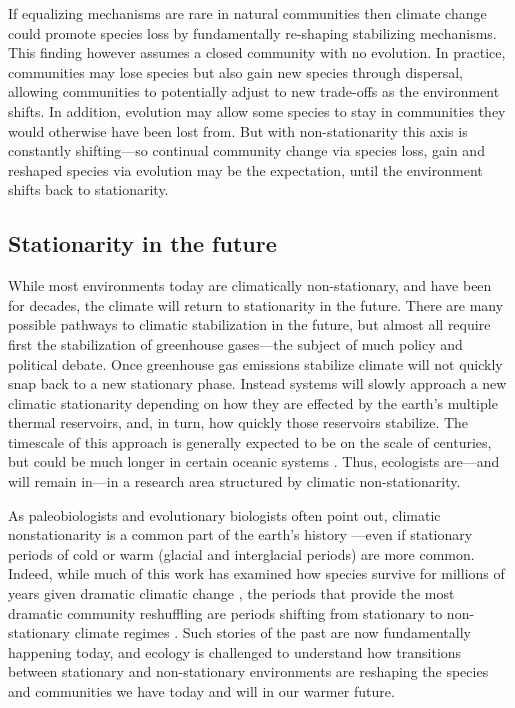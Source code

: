 \documentclass[11pt,letterpaper]{article}
\begin{document}
If equalizing mechanisms are rare in natural communities then climate change could promote species loss by fundamentally re-shaping stabilizing mechanisms. This finding however assumes a closed community with no evolution. In practice, communities may lose species but also gain new species through dispersal, allowing communities to potentially adjust to new trade-offs as the environment shifts. In addition, evolution may allow some species to stay in communities they would otherwise have been lost from. But with non-stationarity this axis is constantly shifting---so continual community change via species loss, gain and reshaped species via evolution may be the expectation, until the environment shifts back to stationarity.

\subsection{Stationarity in the future}

While most environments today are climatically non-stationary, and have been for decades, the climate will return to stationarity in the future. There are many possible pathways to climatic stabilization in the future, but almost all require first the stabilization of greenhouse gases---the subject of much policy and political debate. Once greenhouse gas emissions stabilize climate will not quickly snap back to a new stationary phase. Instead systems will slowly approach a new climatic stationarity depending on how they are effected by the earth's multiple thermal reservoirs, and, in turn, how quickly those reservoirs stabilize. The timescale of this approach is generally expected to be on the scale of centuries, but could be much longer in certain oceanic systems \citep{ipcc2013ch12}. Thus, ecologists are---and will remain in---in a research area structured by climatic non-stationarity. 

As paleobiologists and evolutionary biologists often point out, climatic nonstationarity is a common part of the earth's history \citep{Jansson:2002nz}---even if stationary periods of cold or warm (glacial and interglacial periods) are more common. Indeed, while much of this work has examined how species survive for millions of years given dramatic climatic change \citep{provan2008}, the periods that provide the most dramatic community reshuffling are periods shifting from stationary to non-stationary climate regimes \citep{vrba1980,vrba1985}. Such stories of the past are now fundamentally happening today, and ecology is challenged to understand how transitions between stationary and non-stationary environments are reshaping the species and communities we have today and will in our warmer future. 
\end{document}

